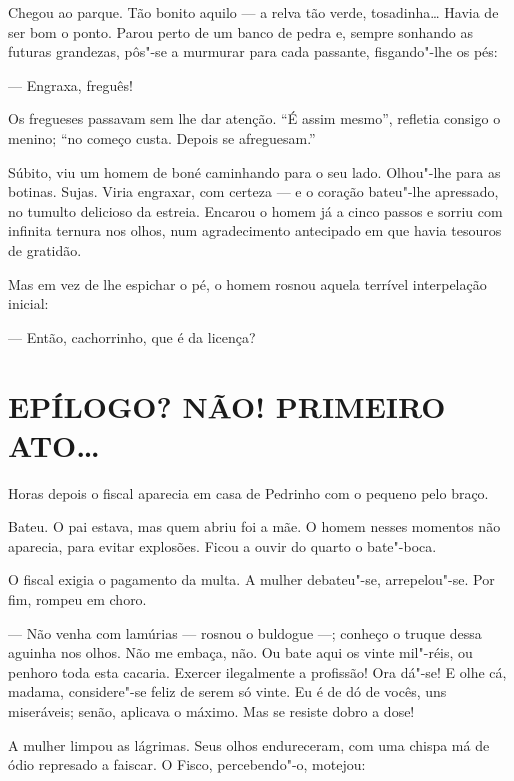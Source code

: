
Chegou ao parque. Tão bonito aquilo --- a relva tão verde, tosadinha\ldots{}
Havia de ser bom o ponto. Parou perto de um banco de pedra e, sempre
sonhando as futuras grandezas, pôs"-se a murmurar para cada passante,
fisgando"-lhe os pés:

--- Engraxa, freguês!

Os fregueses passavam sem lhe dar atenção. ``É assim mesmo'', refletia
consigo o menino; ``no começo custa. Depois se afreguesam.''

Súbito, viu um homem de boné caminhando para o seu lado. Olhou"-lhe para
as botinas. Sujas. Viria engraxar, com certeza --- e o coração bateu"-lhe
apressado, no tumulto delicioso da estreia. Encarou o homem já a cinco
passos e sorriu com infinita ternura nos olhos, num agradecimento
antecipado em que havia tesouros de gratidão.

Mas em vez de lhe espichar o pé, o homem rosnou aquela terrível
interpelação inicial:

--- Então, cachorrinho, que é da licença?

\section*{EPÍLOGO? NÃO! PRIMEIRO ATO\ldots{}}

Horas depois o fiscal aparecia em casa de Pedrinho com o pequeno pelo
braço.

Bateu. O pai estava, mas quem abriu foi a mãe. O homem nesses momentos
não aparecia, para evitar explosões. Ficou a ouvir do quarto o
bate"-boca.

O fiscal exigia o pagamento da multa. A mulher debateu"-se, arrepelou"-se.
Por fim, rompeu em choro.

--- Não venha com lamúrias --- rosnou o buldogue ---; conheço o truque
dessa aguinha nos olhos. Não me embaça, não. Ou bate aqui os vinte
mil"-réis, ou penhoro toda esta cacaria. Exercer ilegalmente a profissão!
Ora dá"-se! E olhe cá, madama, considere"-se feliz de serem só vinte. Eu é
de dó de vocês, uns miseráveis; senão, aplicava o máximo. Mas se resiste
dobro a dose!

A mulher limpou as lágrimas. Seus olhos endureceram, com uma chispa má
de ódio represado a faiscar. O Fisco, percebendo"-o, motejou:

